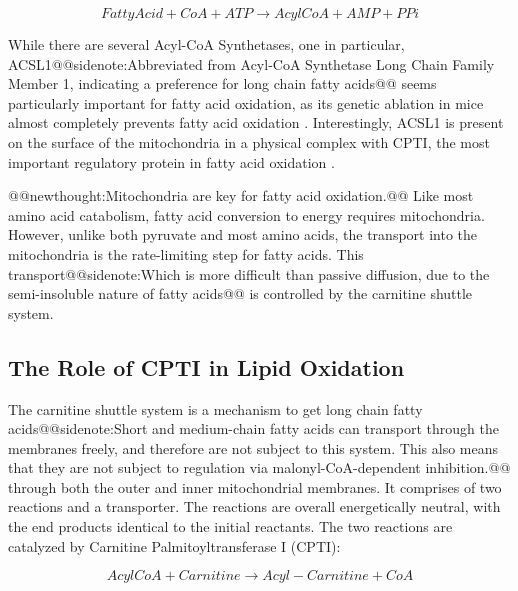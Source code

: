 \documentclass{tufte-handout}
\makeatletter
\def\newthought#1{@@newthought:#1@@}
\def\sidenote#1{@@sidenote:#1@@}
\makeatother
\begin{document}
\begin{equation}\label{eq:acs}
Fatty Acid + CoA +  ATP \rightarrow AcylCoA + AMP + PPi
\end{equation} 

While there are several Acyl-CoA Synthetases, one in particular, ACSL1\sidenote{Abbreviated from Acyl-CoA Synthetase Long Chain Family Member 1, indicating a preference for long chain fatty acids} seems particularly important for fatty acid oxidation, as its genetic ablation in mice almost completely prevents fatty acid oxidation \citep{Ellis2011a}.  Interestingly, ACSL1 is present on the surface of the mitochondria in a physical complex with CPTI, the most important regulatory protein in fatty acid oxidation \citep{Lee2011l}.

\newthought{Mitochondria are key for fatty acid oxidation.}  Like most amino acid catabolism, fatty acid conversion to energy requires mitochondria.  However, unlike both pyruvate and most amino acids, the transport into the mitochondria is the rate-limiting step for fatty acids.  This transport\sidenote{Which is more difficult than passive diffusion, due to the semi-insoluble nature of fatty acids} is controlled by the carnitine shuttle system.

\subsection{The Role of CPTI in Lipid Oxidation}

The carnitine shuttle system is a mechanism to get long chain fatty acids\sidenote{Short and medium-chain fatty acids can transport through the membranes freely, and therefore are not subject to this system.  This also means that they are not subject to regulation via malonyl-CoA-dependent inhibition.} through both the outer and inner mitochondrial membranes.  It comprises of two reactions and a transporter.  The reactions are overall energetically neutral, with the end products identical to the initial reactants.  The two reactions are catalyzed by Carnitine Palmitoyltransferase I (CPTI):

\begin{equation}
AcylCoA + Carnitine \rightarrow Acyl-Carnitine + CoA
\end{equation} 
\end{document}
